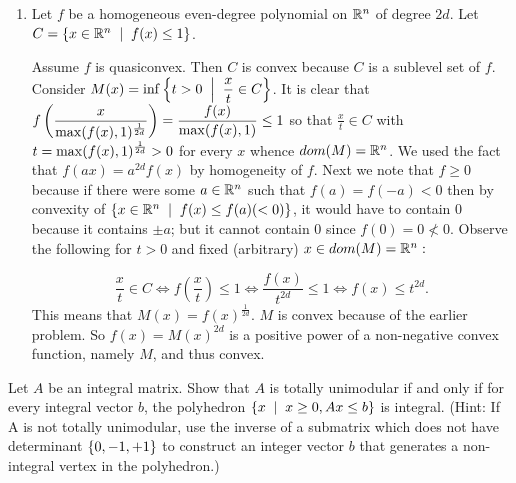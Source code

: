 \begin{enumerate}[leftmargin=*]
\item Let $f$ be a homogeneous even-degree polynomial on $\mathbb{R}^{n}$ of degree $2d$. Let $C=\set{x\in\R^{n}\st f(x)\le 1}$.

Assume $f$ is quasiconvex. Then $C$ is convex because $C$ is a sublevel set of $f$. Consider $\ds M(x) = \inf\set{t>0\st \frac{x}{t}\in C}$. It is clear that $\displaystyle f\left(\frac{x}{\max(f(x),1)^{\frac1{2d}}}\right) = \frac{f(x)}{\max(f(x),1)} \le 1$ so that $\frac{x}{t}\in C$ with $\displaystyle t=\max(f(x),1)^{\frac1{2d}}>0$ for every $x$ whence $dom(M) = \mathbb{R}^{n}$. We used the fact that $f(ax) = a^{2d}f(x)$ by homogeneity of $f$. Next we note that $f\ge 0$ because if there were some $a\in\mathbb{R}^{n}$ such that $f(a)=f(-a)<0$ then by convexity of $\set{x\in\R^{n}\st f(x)\le f(a)( <0)}$, it would have to contain $0$ because it contains $\pm a$; but it cannot contain $0$ since $f(0)=0 \not<0$. Observe the following for $t>0$ and fixed (arbitrary) $x\in dom(M)=\mathbb{R}^{n}:$

$$\frac{x}{t} \in C\iff f\left(\frac{x}{t}\right) \le 1 \iff \frac{f(x)}{t^{2d}}\le 1\iff f(x) \le t^{{2d}}.$$
This means that $M(x) = f(x)^{\frac1{2d}}$. $M$ is convex because of the earlier problem. So $f(x) = M(x)^{2d}$ is a positive power of a non-negative convex function, namely $M$, and thus convex. 

%

\end{enumerate}

\newpage

\pb

Let $A$ be an integral matrix. Show that $A$ is totally unimodular if and only if for every integral vector $b$, the polyhedron $\set{x \st x \ge 0, Ax \le b}$ is integral. (Hint: If A is not totally unimodular, use the inverse of a submatrix which does not have determinant $\left\{0, -1, +1\right\}$ to construct an integer vector $b$ that generates a non-integral vertex in the polyhedron.)

\soln

